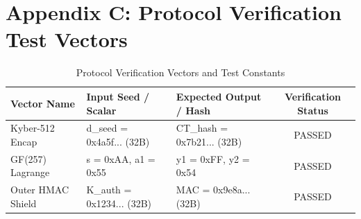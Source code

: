 \documentclass[5p,times]{elsarticle}
\begin{document}
\section*{Appendix C: Protocol Verification Test Vectors}

\begin{table}[!ht]
  \centering
  \tiny
  \caption{Protocol Verification Vectors and Test Constants}
  \label{tab:14}
  \begin{tabularx}{\linewidth}{p{1.6cm}p{2.0cm}p{2.0cm}c}
    \toprule
    \textbf{Vector Name} & \textbf{Input Seed / Scalar} & \textbf{Expected Output / Hash} & \textbf{Verification Status} \\
    \midrule
    Kyber-512 Encap & d\_seed = 0x4a5f... (32B) & CT\_hash = 0x7b21... (32B) & PASSED \\
    GF(257) Lagrange & s = 0xAA, a1 = 0x55 & y1 = 0xFF, y2 = 0x54 & PASSED \\
    Outer HMAC Shield & K\_auth = 0x1234... (32B) & MAC = 0x9e8a... (32B) & PASSED \\
    \bottomrule
  \end{tabularx}
\end{table}
\end{document}

